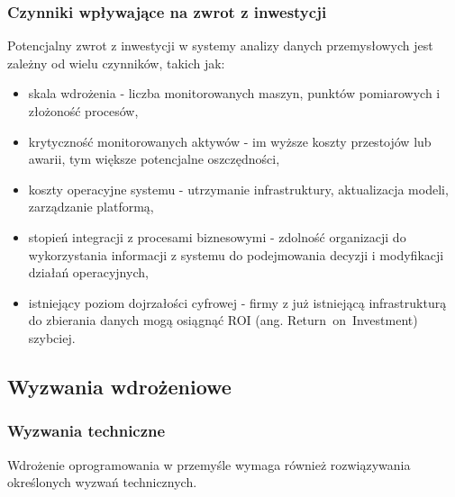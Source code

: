 \subsubsection{Czynniki wpływające na zwrot z inwestycji}
\label{subsubsec:analiza_roi}

Potencjalny zwrot z inwestycji w systemy analizy danych przemysłowych jest zależny od wielu czynników, takich jak:

\vspace{0.3em}

\begin{itemize}
    \item skala wdrożenia - liczba monitorowanych maszyn, punktów pomiarowych i złożoność procesów,
    \item krytyczność monitorowanych aktywów - im wyższe koszty przestojów lub awarii, tym większe potencjalne oszczędności,
    \item koszty operacyjne systemu - utrzymanie infrastruktury, aktualizacja modeli, zarządzanie platformą,
    \item stopień integracji z procesami biznesowymi - zdolność organizacji do wykorzystania informacji z systemu do podejmowania decyzji i modyfikacji działań operacyjnych,
    \item istniejący poziom dojrzałości cyfrowej - firmy z już istniejącą infrastrukturą do zbierania danych mogą osiągnąć ROI (ang. \mbox{Return on Investment}) szybciej.
\end{itemize}

\newpage

\subsection{Wyzwania wdrożeniowe}
\label{subsec:wyzwania_wdrozeniowe}

\subsubsection{Wyzwania techniczne}
\label{subsubsec:wyzwania_techniczne}

Wdrożenie oprogramowania w przemyśle wymaga również rozwiązywania określonych wyzwań technicznych.

\vspace{0.3em}

